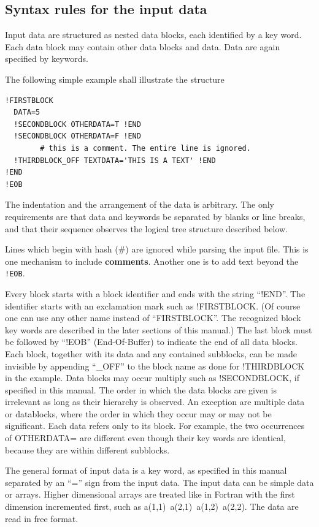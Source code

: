 \documentclass[final,12pt,makeidx,DIV=calc]{article}
\begin{document}
\subsection{Syntax rules for the input data}

Input data are structured as nested data blocks, each identified
by a key word. Each data block may contain other data blocks and
data. Data are again specified by keywords.

The following simple example shall illustrate the structure 
\begin{verbatim}
!FIRSTBLOCK
  DATA=5
  !SECONDBLOCK OTHERDATA=T !END
  !SECONDBLOCK OTHERDATA=F !END
        # this is a comment. The entire line is ignored.
  !THIRDBLOCK_OFF TEXTDATA='THIS IS A TEXT' !END
!END
!EOB
\end{verbatim}
The indentation and the arrangement of the data is arbitrary. The only
requirements are that data and keywords be separated by blanks or
line breaks, and that their sequence observes the logical tree structure
described below.

Lines which begin with hash ($\#$) are ignored while parsing the input
file. This is one mechanism to include
\textbf{comments}. Another one is to add
text beyond the \verb|!EOB|.

Every block starts with a block identifier and ends with the string
``!END''.  The identifier starts with an exclamation mark such as
!FIRSTBLOCK. (Of course one can use any other name instead of
``FIRSTBLOCK''. The recognized block key words are described in the
later sections of this manual.) The last block must be followed by
``!EOB'' (End-Of-Buffer) to indicate the end of all data blocks. Each
block, together with its data and any contained subblocks, can be
made invisible by appending ``\_OFF'' to the block name as done for
!THIRDBLOCK in the example. Data blocks may occur multiply such as
!SECONDBLOCK, if specified in this manual. The order in which the data
blocks are given is irrelevant as long as their hierarchy is observed.
An exception are multiple data or datablocks, where the order in
which they occur may or may not be significant.  Each data refers
only to its block. For example, the two occurrences of OTHERDATA=
are different even though their key words are identical, because they
are within different subblocks.

The general format of input data is a key word, as specified in this
manual separated by an ``='' sign from the input data.  The input data
can be simple data or arrays. Higher dimensional arrays are treated
like in Fortran with the first dimension incremented first, such as
a(1,1)\ a(2,1)\ a(1,2)\ a(2,2). The data are read in free format.
\end{document}

